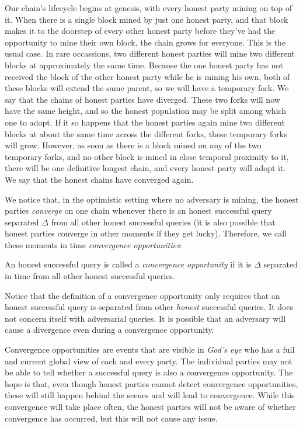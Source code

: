 Our chain's lifecycle begins at genesis, with every honest party mining on top of it.
When there is a single block mined by just one honest party, and that block makes it to
the doorstep of every other honest party before they've had the opportunity to mine their
own block, the chain grows for everyone. This is the usual case. In rare occassions, two
different honest parties will mine two different blocks at approximately the same time.
Because the one honest party has not received the block of the other honest party while
he is mining his own, both of these blocks will extend the same parent, so we will have a
temporary fork. We say that the chains of honest parties have diverged.
These two forks will now have the same height, and so the honest population
may be split among which one to adopt. If it so happens that the honest parties again
mine two different blocks at about the same time across the different forks, these temporary
forks will grow. However, as soon as there is a block mined on any of the
two temporary forks, and no other block is mined in close temporal proximity to it,
there will be one definitive longest chain, and every honest party will adopt it.
We say that the honest chains have converged again.

We notice that, in the optimistic setting where no adversary is mining, the honest parties
\emph{converge} on one chain whenever there is an honest successful query separated $\Delta$
from all other honest successful queries (it is also possible that honest parties converge
in other moments if they get lucky). Therefore, we call these moments in time \emph{convergence
opportunities}:

\begin{definition}
    An honest successful query is called a \emph{convergence opportunity} if it is $\Delta$
    separated in time from all other honest successful queries.
\end{definition}

Notice that the definition of a convergence opportunity only requires that an honest successful
query is separated from other \emph{honest} successful queries. It does not concern itself with
adversarial queries. It is possible that an adversary will cause a divergence even during a
convergence opportunity.

Convergence opportunities are events that are visible in \emph{God's eye} who has a full
and current global view of each and every party. The individual parties may not be able to tell
whether a successful query is also a convergence opportunity. The hope is that, even though honest
parties cannot detect convergence opportunities, these will still happen behind the scenes
and will lead to convergence. While this convergence will take place often, the honest
parties will not be aware of whether convergence has occurred, but this will not cause
any issue.

